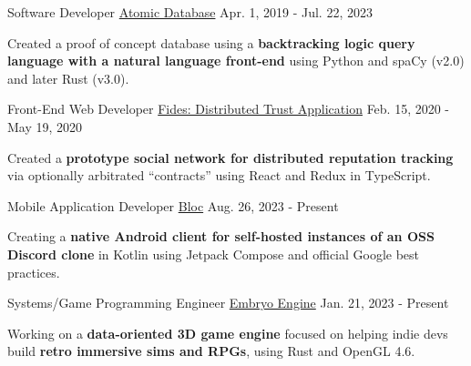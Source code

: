 

\begin{cventries}

  \cventry
    {Software Developer} %
    {\href{https://github.com/alexispurslane/atomicdatabase}{Atomic Database}}
    {}
    {Apr. 1, 2019 - Jul. 22, 2023} %
    {
      \begin{cvitems} %
        \item {Created a proof of concept database using a \textbf{backtracking logic query language with a natural language front-end} using Python and spaCy (v2.0) and later Rust (v3.0).}
      \end{cvitems}
    }

    \cventry
    {Front-End Web Developer} %
    {\href{https://github.com/alexispurslane/fides}{Fides: Distributed Trust Application}}
    {}
    {Feb. 15, 2020 - May 19, 2020} %
    {
      \begin{cvitems} %
        \item {Created a \textbf{prototype social network for distributed reputation tracking} via optionally arbitrated ``contracts'' using React and Redux in TypeScript.}
      \end{cvitems}
    }

    \cventry
    {Mobile Application Developer} %
    {\href{https://github.com/alexispurslane/bloc}{Bloc}}
    {}
    {Aug. 26, 2023 - Present} %
    {
      \begin{cvitems} %
        \item {Creating a \textbf{native Android client for self-hosted instances of an OSS Discord clone} in Kotlin using Jetpack Compose and official Google best practices.}
      \end{cvitems}
    }

    \cventry
    {Systems/Game Programming Engineer}
    {\href{https://github.com/alexispurslane/embryo-engine}{Embryo Engine}}
    {}
    {Jan. 21, 2023 - Present}
    {
      \begin{cvitems}
        \item {Working on a \textbf{data-oriented 3D game engine} focused on helping indie devs build \textbf{retro immersive sims and RPGs}, using Rust and OpenGL 4.6.}
      \end{cvitems}
    }


\end{cventries}
